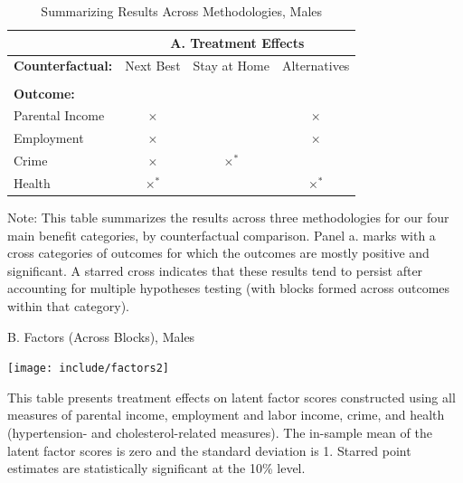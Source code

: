 \documentclass[static]{JJH-Beamer}
\begin{document}
\begin{frame}
 \addtocounter{framenumber}{-1}

\begin{table}[H]
\caption{Summarizing Results Across Methodologies, Males}
\begin{center}
\begin{tabular}{lccc}
\toprule
& \multicolumn{3}{c}{\textbf{A. Treatment Effects}}  \\
 \midrule
 \textbf{Counterfactual:} & Next Best & Stay at Home & Alternatives  \\ \\
 \textbf{Outcome:} & \\
Parental Income & $\times$ & & $\times$ \\
Employment & $\times$ & & $\times$   \\
Crime & $\times$ & $\times^*$    \\
Health & $\times^*$ &  & $\times^*$    \\
\bottomrule
\end{tabular}
\end{center}
\tiny\flushleft Note: This table summarizes the results across three methodologies for our four main benefit categories, by counterfactual comparison. Panel a. marks with a cross categories of outcomes for which the outcomes are mostly positive and significant. A starred cross indicates that these results tend to persist after accounting for multiple hypotheses testing (with blocks formed across outcomes within that category).\\
\end{table}

\end{frame}

\begin{frame}
 \addtocounter{framenumber}{-1}

\begin{table}[H]
\addtocounter{table}{-1}
\caption{B. Factors (Across Blocks), Males}
\begin{center}
\texttt{[image: include/factors2]}
\end{center}
\end{table}
{\flushleft \tiny This table presents treatment effects on latent factor scores constructed using all measures of parental income, employment and labor income, crime, and health (hypertension- and cholesterol-related measures). The in-sample mean of the latent factor scores is zero and the standard deviation is 1. Starred point estimates are statistically significant at the 10\% level.\\}

\end{frame}
\end{document}
